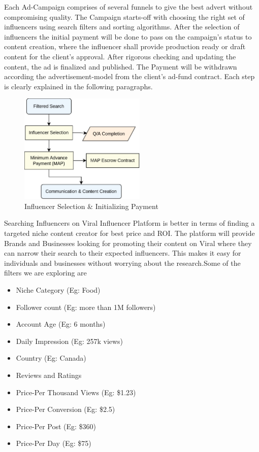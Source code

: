 \documentclass[conference]{IEEEtran}
\begin{document}
Each Ad-Campaign comprises of several funnels to give the best advert without compromising quality. The Campaign starts-off with choosing the right set of influencers using search filters and sorting algorithms. After the selection of influencers the initial payment will be done to pass on the campaign's status to content creation, where the influencer shall provide production ready or draft content for the client's approval. After rigorous checking and updating the content, the ad is finalized and published. The Payment will be withdrawn according the advertisement-model from the client's ad-fund contract. Each step is clearly explained in the following paragraphs.\\ 

\begin{figure}[H]
\begin{center}
\includegraphics[width=6cm]{ad-selection}
\caption{Influencer Selection \& Initializing Payment}
\end{center}
\end{figure}

Searching Influencers on Viral Influencer Platform is better in terms of finding a targeted niche content creator for best price and ROI. The platform will provide Brands and Businesses looking for promoting their content on Viral where they can narrow their search to their expected influencers. This makes it easy for individuals and businesses without worrying about the research.Some of the filters we are exploring are
\begin{itemize}[wide, labelwidth=!, labelindent=0pt]
\item Niche Category (Eg: Food)
\item Follower count (Eg: more than 1M followers)
\item Account Age (Eg: 6 months)
\item Daily Impression (Eg: 257k views)
\item Country (Eg: Canada)
\item Reviews and Ratings
\item Price-Per Thousand Views (Eg: \$1.23)
\item Price-Per Conversion (Eg: \$2.5)
\item Price-Per Post (Eg: \$360)
\item Price-Per Day (Eg: \$75)
\end{itemize}
\end{document}
